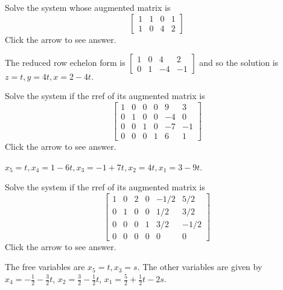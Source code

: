 \documentclass{ximera}
\begin{document}
\begin{problem}\label{prb:2.27} Solve the system whose augmented matrix is
\begin{equation*}
\left[
\begin{array}{rrr|r}
1 & 1 & 0 & 1 \\
1 & 0 & 4 & 2
\end{array}
\right]
\end{equation*}
Click the arrow to see answer. 
\begin{expandable}
The reduced row echelon form is $\left[
\begin{array}{rrr|r}
1 & 0 & 4 & 2 \\
0 & 1 & -4 & -1
\end{array}
\right] $ and so the solution is $z=t,y=4t,x=2-4t.$
\end{expandable}
\end{problem}

\begin{problem}\label{prb:2.28} Solve the system if the rref of its augmented matrix is
$$\left[
\begin{array}{rrrrr|r}
1 & 0 & 0 & 0 & 9 & 3 \\
0 & 1 & 0 & 0 & -4 & 0 \\
0 & 0 & 1 & 0 & -7 & -1 \\
0 & 0 & 0 & 1 & 6 & 1
\end{array}
\right] $$
Click the arrow to see answer. 
\begin{expandable}
$x_{5}=t,x_{4}=1-6t,x_{3}=-1+7t,x_{2}=4t,x_{1}=3-9t$.
\end{expandable}
\end{problem}

\begin{problem}\label{prb:2.29} Solve the system if the rref of its augmented matrix is
$$\left[
\begin{array}{rrrrr|r}
1 & 0 & 2 & 0 & -1/2 &  5/2 \\
0 & 1 & 0 & 0 &  1/2 &  3/2 \\
0 & 0 & 0 & 1 &  3/2 & -1/2 \\
0 & 0 & 0 & 0 & 0 & 0
\end{array}
\right] $$
Click the arrow to see answer. 
\begin{expandable}
The free variables are $x_{5}=t,x_{3}=s$. The other variables are
given by $x_{4}=-\frac{1}{2}-\frac{3}{2}t$, $x_{2}=\frac{3}{2}-\frac{1}{2}t$, $x_{1}=\frac{5}{2}+\frac{1}{2}t-2s$.
\end{expandable}
\end{problem}
\end{document}
